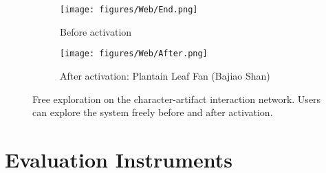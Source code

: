 \begin{figure}[htbp]
  \centering
  \begin{subfigure}[t]{0.47\textwidth}
    \centering
    \texttt{[image: figures/Web/End.png]}
    \caption{Before activation}
    \label{fig:explore_before}
  \end{subfigure}
  \hspace{0.05\textwidth}
  \begin{subfigure}[t]{0.47\textwidth}
    \centering
    \texttt{[image: figures/Web/After.png]}
    \caption{After activation: Plantain Leaf Fan (Bajiao Shan)}
    \label{fig:explore_after}
  \end{subfigure}
  \caption{Free exploration on the character-artifact interaction network. Users can explore the system freely before and after activation.}
  \label{fig:explore_combined}
\end{figure}


\section{Evaluation Instruments}
